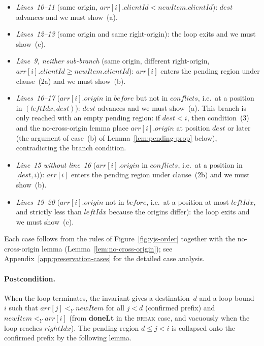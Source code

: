 \documentclass[sigplan,screen]{acmart}
\newcommand{\YjsLt}{\mathrel{<_Y}}
\begin{document}
\begin{itemize}
\item \emph{Lines~10--11} (same origin,
  $\mathit{arr}[i].\mathit{clientId} <
  \mathit{newItem}.\mathit{clientId}$):
  $\mathit{dest}$ advances and we must show~(a).
\item \emph{Lines~12--13} (same origin and same right-origin):
  the loop exits and we must show~(c).
\item \emph{Line~9, neither sub-branch} (same origin, different
  right-origin, $\mathit{arr}[i].\mathit{clientId} \geq
  \mathit{newItem}.\mathit{clientId}$):
  $\mathit{arr}[i]$ enters the pending region under clause~(2a) and we
  must show~(b).
\item \emph{Lines~16--17} ($\mathit{arr}[i].\mathit{origin}$ in
  $\mathit{before}$ but not in $\mathit{conflicts}$, i.e.\ at a
  position in $(\mathit{leftIdx}, \mathit{dest})$):
  $\mathit{dest}$ advances and we must show~(a).  This branch is only
  reached with an empty pending region: if $\mathit{dest} < i$, then
  condition~(3) and the no-cross-origin lemma place
  $\mathit{arr}[i].\mathit{origin}$ at position $\mathit{dest}$ or
  later (the argument of case~(b) of Lemma~\ref{lem:pending-prop}
  below), contradicting the branch condition.
\item \emph{Line~15 without line~16} ($\mathit{arr}[i].\mathit{origin}$
  in $\mathit{conflicts}$, i.e.\ at a position in $[\mathit{dest}, i)$):
  $\mathit{arr}[i]$ enters the pending region under clause~(2b) and we
  must show~(b).
\item \emph{Lines~19--20} ($\mathit{arr}[i].\mathit{origin}$ not in
  $\mathit{before}$, i.e.\ at a position at most $\mathit{leftIdx}$,
  and strictly less than $\mathit{leftIdx}$ because the origins differ):
  the loop exits and we must show~(c).
\end{itemize}
Each case follows from the rules of Figure~\ref{fig:yjs-order} together
with the no-cross-origin lemma (Lemma~\ref{lem:no-cross-origin}); see
Appendix~\ref{app:preservation-cases} for the detailed case analysis.

\paragraph{Postcondition.}
When the loop terminates, the invariant gives a destination~$d$ and a
loop bound~$i$ such that $\mathit{arr}[j] \YjsLt \mathit{newItem}$ for
all $j < d$ (confirmed prefix) and $\mathit{newItem} \YjsLt
\mathit{arr}[i]$ (from \textbf{doneLt} in the \textsc{break} case, and
vacuously when the loop reaches $\mathit{rightIdx}$).  The pending
region $d \leq j < i$ is collapsed onto the confirmed prefix by the
following lemma.
\end{document}
